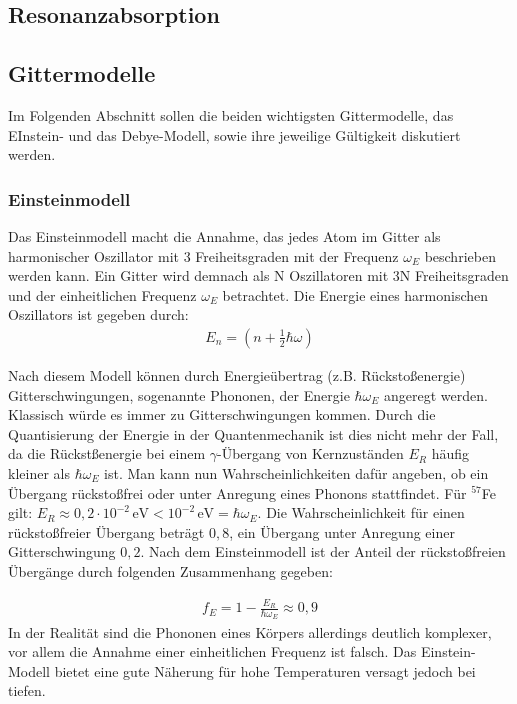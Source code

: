 \subsection{Resonanzabsorption}

\subsection{Gittermodelle}

Im Folgenden Abschnitt sollen die beiden wichtigsten Gittermodelle, das EInstein- und das Debye-Modell, sowie ihre jeweilige Gültigkeit diskutiert werden.

\subsubsection{Einsteinmodell}

Das Einsteinmodell macht die Annahme, das jedes Atom im Gitter als harmonischer Oszillator mit 3 Freiheitsgraden mit der Frequenz $\omega_E$ beschrieben werden kann. Ein Gitter wird demnach als N Oszillatoren mit 3N Freiheitsgraden und der einheitlichen Frequenz  $\omega_E$ betrachtet. Die Energie eines harmonischen Oszillators ist gegeben durch:
\begin{align}
E_n=\left( n+\frac{1}{2}\hbar\omega\right) 
\end{align} 

Nach diesem Modell können durch Energieübertrag  (z.B. Rückstoßenergie)  Gitterschwingungen, sogenannte Phononen, der Energie $\hbar \omega_E$ angeregt werden. Klassisch würde es immer zu Gitterschwingungen kommen. Durch die Quantisierung der Energie in der Quantenmechanik ist dies nicht mehr der Fall, da die Rückstßenergie bei einem $\gamma$-Übergang von Kernzuständen $E_R$ häufig kleiner als $\hbar \omega_E$ ist. Man kann nun Wahrscheinlichkeiten dafür angeben, ob ein Übergang rückstoßfrei oder unter Anregung eines Phonons stattfindet. Für  $^{57}$Fe gilt:
$E_R\approx0,2\cdot10^{-2}\,\mathrm{eV} < 10^{-2}\,\mathrm{eV}=\hbar\omega_E $. Die Wahrscheinlichkeit für einen rückstoßfreier Übergang beträgt $0,8$, ein Übergang unter Anregung einer Gitterschwingung $0,2$. Nach dem Einsteinmodell ist der Anteil der rückstoßfreien Übergänge durch folgenden Zusammenhang gegeben:

\begin{align}
f_E = 1-\frac{E_R}{\hbar \omega_E}\approx0,9
\end{align}
In der Realität sind die Phononen eines Körpers allerdings deutlich komplexer, vor allem die Annahme einer einheitlichen Frequenz ist falsch. Das Einstein-Modell bietet eine gute Näherung für hohe Temperaturen versagt jedoch bei tiefen.

